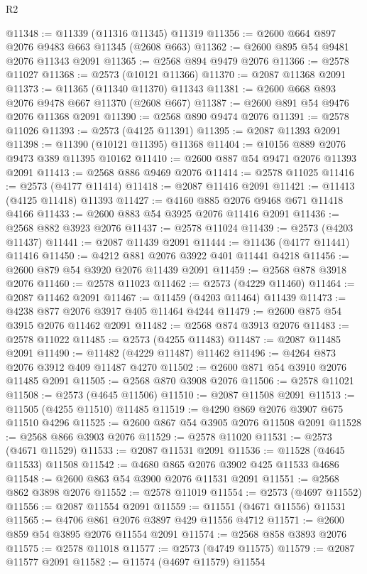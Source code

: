 \begin{lexlean}{R2}
\begin{coremodule}
@11348 := @11339 (@11316 @11345) @11319
@11356 := @2600 @664 @897 @2076 @9483 @663 @11345 (@2608 @663)
@11362 := @2600 @895 @54 @9481 @2076 @11343 @2091
@11365 := @2568 @894 @9479 @2076
@11366 := @2578 @11027
@11368 := @2573 (@10121 @11366)
@11370 := @2087 @11368 @2091
@11373 := @11365 (@11340 @11370) @11343
@11381 := @2600 @668 @893 @2076 @9478 @667 @11370 (@2608 @667)
@11387 := @2600 @891 @54 @9476 @2076 @11368 @2091
@11390 := @2568 @890 @9474 @2076
@11391 := @2578 @11026
@11393 := @2573 (@4125 @11391)
@11395 := @2087 @11393 @2091
@11398 := @11390 (@10121 @11395) @11368
@11404 := @10156 @889 @2076 @9473 @389 @11395 @10162
@11410 := @2600 @887 @54 @9471 @2076 @11393 @2091
@11413 := @2568 @886 @9469 @2076
@11414 := @2578 @11025
@11416 := @2573 (@4177 @11414)
@11418 := @2087 @11416 @2091
@11421 := @11413 (@4125 @11418) @11393
@11427 := @4160 @885 @2076 @9468 @671 @11418 @4166
@11433 := @2600 @883 @54 @3925 @2076 @11416 @2091
@11436 := @2568 @882 @3923 @2076
@11437 := @2578 @11024
@11439 := @2573 (@4203 @11437)
@11441 := @2087 @11439 @2091
@11444 := @11436 (@4177 @11441) @11416
@11450 := @4212 @881 @2076 @3922 @401 @11441 @4218
@11456 := @2600 @879 @54 @3920 @2076 @11439 @2091
@11459 := @2568 @878 @3918 @2076
@11460 := @2578 @11023
@11462 := @2573 (@4229 @11460)
@11464 := @2087 @11462 @2091
@11467 := @11459 (@4203 @11464) @11439
@11473 := @4238 @877 @2076 @3917 @405 @11464 @4244
@11479 := @2600 @875 @54 @3915 @2076 @11462 @2091
@11482 := @2568 @874 @3913 @2076
@11483 := @2578 @11022
@11485 := @2573 (@4255 @11483)
@11487 := @2087 @11485 @2091
@11490 := @11482 (@4229 @11487) @11462
@11496 := @4264 @873 @2076 @3912 @409 @11487 @4270
@11502 := @2600 @871 @54 @3910 @2076 @11485 @2091
@11505 := @2568 @870 @3908 @2076
@11506 := @2578 @11021
@11508 := @2573 (@4645 @11506)
@11510 := @2087 @11508 @2091
@11513 := @11505 (@4255 @11510) @11485
@11519 := @4290 @869 @2076 @3907 @675 @11510 @4296
@11525 := @2600 @867 @54 @3905 @2076 @11508 @2091
@11528 := @2568 @866 @3903 @2076
@11529 := @2578 @11020
@11531 := @2573 (@4671 @11529)
@11533 := @2087 @11531 @2091
@11536 := @11528 (@4645 @11533) @11508
@11542 := @4680 @865 @2076 @3902 @425 @11533 @4686
@11548 := @2600 @863 @54 @3900 @2076 @11531 @2091
@11551 := @2568 @862 @3898 @2076
@11552 := @2578 @11019
@11554 := @2573 (@4697 @11552)
@11556 := @2087 @11554 @2091
@11559 := @11551 (@4671 @11556) @11531
@11565 := @4706 @861 @2076 @3897 @429 @11556 @4712
@11571 := @2600 @859 @54 @3895 @2076 @11554 @2091
@11574 := @2568 @858 @3893 @2076
@11575 := @2578 @11018
@11577 := @2573 (@4749 @11575)
@11579 := @2087 @11577 @2091
@11582 := @11574 (@4697 @11579) @11554

\end{coremodule}
\end{lexlean}
